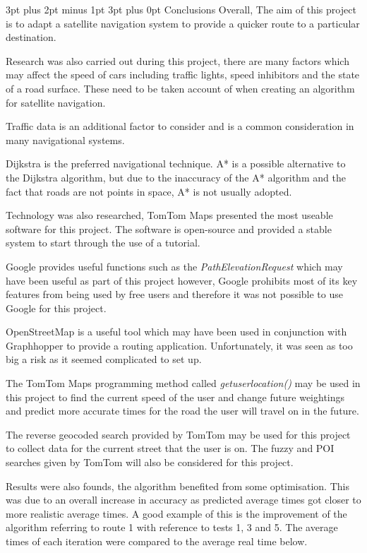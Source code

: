\documentclass[12pt,a4paper]{article}
\makeatletter
\renewcommand\subsection{\@startsection {subsection}{1}{0mm} %
                               {3pt plus 2pt minus 1pt} %
                               {3pt plus 0pt} %
                               {\normalfont\bfseries}}
\makeatother
\begin{document}
\subsection{Conclusions}
Overall, The aim of this project is to adapt a satellite navigation system to provide a quicker route to a particular destination.

Research was also carried out during this project, there are many factors which may affect the speed of cars including traffic lights, speed inhibitors and the state of a road surface. These need to be taken account of when creating an algorithm for satellite navigation.

Traffic data is an additional factor to consider and is a common consideration in many navigational systems.

Dijkstra is the preferred navigational technique. A* is a possible alternative to the Dijkstra algorithm, but due to the inaccuracy of the A* algorithm and the fact that roads are not points in space, A* is not usually adopted.

Technology was also researched, TomTom Maps presented the most useable software for this project. The software is open-source and provided a stable system to start through the use of a tutorial. 
 
 Google provides useful functions such as the \textit{PathElevationRequest} which may have been useful as part of this project however, Google prohibits most of its key features from being used by free users and therefore it was not possible to use Google for this project.
 
 OpenStreetMap is a useful tool which may have been used in conjunction with Graphhopper to provide a routing application. Unfortunately, it was seen as too big a risk as it seemed complicated to set up.
 
 The TomTom Maps programming method called \textit{getuserlocation()} may be used in this project to find the current speed of the user and change future weightings and predict more accurate times for the road the user will travel on in the future. 
 
 The reverse geocoded search provided by TomTom may be used for this project to collect data for the current street that the user is on. 
 The fuzzy and POI searches given by TomTom will also be considered for this project.
 
 Results were also founds, the algorithm benefited from some optimisation. This was due to an overall increase in accuracy as predicted average times got closer to more realistic average times. A good example of this is the improvement of the algorithm referring to route 1 with reference to tests 1, 3 and 5. The average times of each iteration were compared to the average real time below.
 
\end{document}
